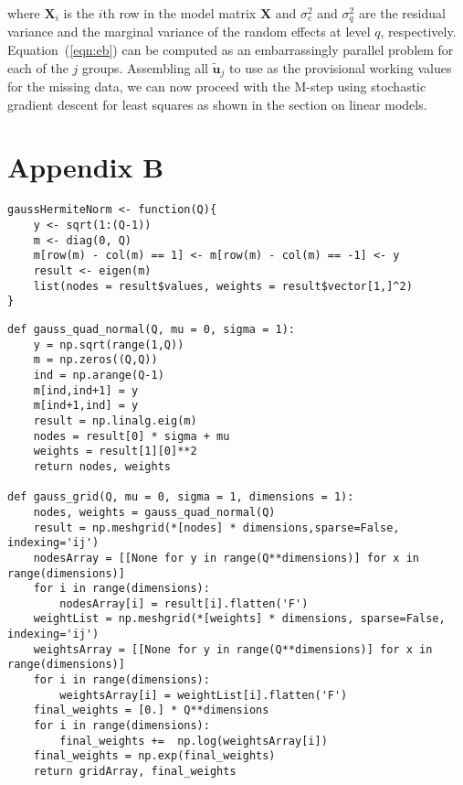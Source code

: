 \documentclass[12pt]{article}
\begin{document}
\noindent where $\bm{X}_i$ is the $i$th row in the model matrix $\bm{X}$ and $\sigma_{e}^2$ and $\sigma_{q}^2$ are the residual variance and the marginal variance of the random effects at level $q$, respectively. Equation~(\ref{eqn:eb}) can be computed as an embarrassingly parallel problem for each of the $j$ groups. Assembling all $\bm{\widetilde{u}}_j$ to use as the provisional working values for the missing data, we can now proceed with the M-step using stochastic gradient descent for least squares as shown in the section on linear models. 

\newpage
\section*{Appendix B}

\lstset{tabsize=2}
\begin{lstlisting}
gaussHermiteNorm <- function(Q){
	y <- sqrt(1:(Q-1))
	m <- diag(0, Q)
	m[row(m) - col(m) == 1] <- m[row(m) - col(m) == -1] <- y
	result <- eigen(m)
	list(nodes = result$values, weights = result$vector[1,]^2)
}
\end{lstlisting}

\lstset{tabsize=2}
\begin{lstlisting}
def gauss_quad_normal(Q, mu = 0, sigma = 1):
    y = np.sqrt(range(1,Q))
    m = np.zeros((Q,Q))
    ind = np.arange(Q-1)
    m[ind,ind+1] = y
    m[ind+1,ind] = y
    result = np.linalg.eig(m)
    nodes = result[0] * sigma + mu
    weights = result[1][0]**2
    return nodes, weights

def gauss_grid(Q, mu = 0, sigma = 1, dimensions = 1):
    nodes, weights = gauss_quad_normal(Q)
    result = np.meshgrid(*[nodes] * dimensions,sparse=False, indexing='ij')
    nodesArray = [[None for y in range(Q**dimensions)] for x in range(dimensions)]
    for i in range(dimensions):
        nodesArray[i] = result[i].flatten('F')
    weightList = np.meshgrid(*[weights] * dimensions, sparse=False, indexing='ij')
    weightsArray = [[None for y in range(Q**dimensions)] for x in range(dimensions)]
    for i in range(dimensions):
        weightsArray[i] = weightList[i].flatten('F')
    final_weights = [0.] * Q**dimensions
    for i in range(dimensions):
        final_weights +=  np.log(weightsArray[i])
    final_weights = np.exp(final_weights)
    return gridArray, final_weights
\end{lstlisting}

\clearpage 
 
\end{document}
